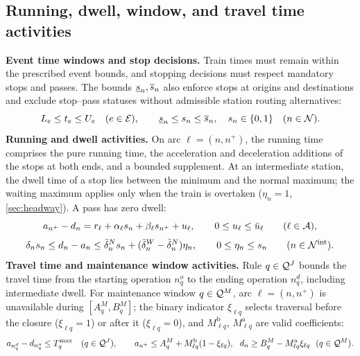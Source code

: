 \subsection{Running, dwell, window, and travel time activities}
\textbf{Event time windows and stop decisions.} Train times must remain within the prescribed event bounds, and stopping decisions must respect mandatory stops and passes. The bounds $\underline{s}_n,\overline{s}_n$ also enforce stops at origins and destinations and exclude stop--pass statuses without admissible station routing alternatives:
\begin{equation}
L_e\le t_e\le U_e\quad(e\in\mathcal{E}),\qquad \underline{s}_n\le s_n\le\overline{s}_n,\quad s_n\in\{0,1\}\quad(n\in\mathcal{N}).\label{eq:bounds}
\end{equation}
\textbf{Running and dwell activities.} On arc $\ell=(n,n^+)$, the running time comprises the pure running time, the acceleration and deceleration additions of the stops at both ends, and a bounded supplement. At an intermediate station, the dwell time of a stop lies between the minimum and the normal maximum; the waiting maximum applies only when the train is overtaken ($\eta_n=1$, \cref{sec:headway}). A pass has zero dwell:
\begin{equation}
a_{n^+}-d_n=r_\ell+\alpha_\ell s_n+\beta_\ell s_{n^+}+u_\ell,\qquad 0\le u_\ell\le\bar u_\ell\qquad(\ell\in\mathcal{A}),\label{eq:run}
\end{equation}
\begin{equation}
\delta_ns_n\le d_n-a_n\le\bar\delta^N_ns_n+(\bar\delta^W_n-\bar\delta^N_n)\eta_n,\qquad 0\le\eta_n\le s_n\qquad(n\in\mathcal{N}^{\mathrm{int}}).\label{eq:dwell}
\end{equation}
\textbf{Travel time and maintenance window activities.} Rule $q\in\mathcal{Q}^J$ bounds the travel time from the starting operation $n^o_q$ to the ending operation $n^d_q$, including intermediate dwell. For maintenance window $q\in\mathcal{Q}^M$, arc $\ell=(n,n^+)$ is unavailable during $[A^M_q,B^M_q]$; the binary indicator $\xi_{\ell q}$ selects traversal before the closure ($\xi_{\ell q}=1$) or after it ($\xi_{\ell q}=0$), and $M^{\mathrm{b}}_{\ell q}$, $M^{\mathrm{a}}_{\ell q}$ are valid coefficients:
\begin{equation}
a_{n^d_q}-d_{n^o_q}\le T^{\max}_q\quad(q\in\Qset^J),\qquad a_{n^+}\le A^M_q+M^{\mathrm{b}}_{\ell q}(1-\xi_{\ell q}),\ \ d_n\ge B^M_q-M^{\mathrm{a}}_{\ell q}\xi_{\ell q}\ \ (q\in\Qset^M).\label{eq:maint}
\end{equation}


